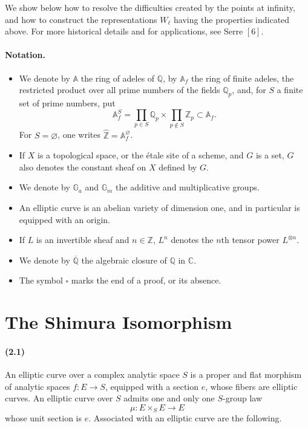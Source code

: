 \documentclass[10pt]{article}
\newcommand{\A}{\mathbb A}
\newcommand{\Af}{\mathbb A_f}
\newcommand{\C}{\mathbb C}
\newcommand{\Q}{\mathbb Q}
\newcommand{\Z}{\mathbb Z}
\newcommand{\bZ}{\widehat{\mathbb Z}}
\newcommand{\Ga}{\mathbb G_a}
\newcommand{\Gm}{\mathbb G_m}
\begin{document}
We show below how to resolve the difficulties created by the points at infinity, and how
to construct the representations $W_\ell$ having the properties indicated above. For more
historical details and for applications, see Serre \([6]\).

\paragraph{Notation.}
\begin{itemize}
\item We denote by $\A$ the ring of adeles of $\Q$, by $\Af$ the ring of finite adeles, the
restricted product over all prime numbers of the fields $\Q_p$, and, for $S$ a finite set of
prime numbers, put
\[
\Af^S=\prod_{p\in S}\Q_p\times\prod_{p\notin S}\Z_p\subset \Af .
\]
For $S=\varnothing$, one writes $\bZ=\Af^\varnothing$.
\item If $X$ is a topological space, or the étale site of a scheme, and $G$ is a set, $G$ also
denotes the constant sheaf on $X$ defined by $G$.
\item We denote by $\Ga$ and $\Gm$ the additive and multiplicative groups.
\item An elliptic curve is an abelian variety of dimension one, and in particular is equipped
with an origin.
\item If $L$ is an invertible sheaf and $n\in\Z$, $L^n$ denotes the $n$th tensor power
$L^{\otimes n}$.
\item We denote by $\overline{\Q}$ the algebraic closure of $\Q$ in $\C$.
\item The symbol $\square$ marks the end of a proof, or its absence.
\end{itemize}

\section{The Shimura Isomorphism}

\paragraph{(2.1)}
An elliptic curve over a complex analytic space $S$ is a proper and flat morphism of
analytic spaces $f:E\to S$, equipped with a section $e$, whose fibers are elliptic curves.
An elliptic curve over $S$ admits one and only one $S$-group law
\[
\mu:E\times_S E\to E
\]
whose unit section is $e$. Associated with an elliptic curve are the following.
\end{document}
